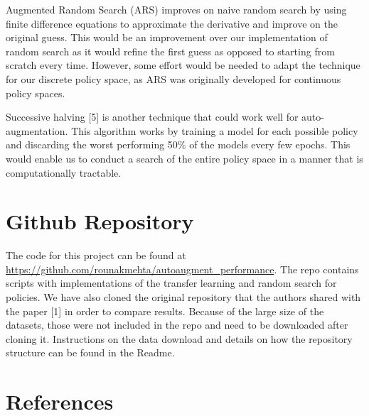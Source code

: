 \documentclass[10pt,twocolumn,letterpaper]{article}
\begin{document}
Augmented Random Search (ARS) improves on naive random search by using finite difference equations to approximate the derivative and improve on the original guess. This would be an improvement over our implementation of random search as it would refine the first guess as opposed to starting from scratch every time. However, some effort would be needed to adapt the technique for our discrete policy space, as ARS was originally developed for continuous policy spaces.

Successive halving [5] is another technique that could work well for auto-augmentation. This algorithm works by training a model for each possible policy and discarding the worst performing 50\% of the models every few epochs. This would enable us to conduct a search of the entire policy space in a manner that is computationally tractable.

\section{Github Repository}

The code for this project can be found at \url{https://github.com/rounakmehta/autoaugment_performance}. The repo contains scripts with implementations of the transfer learning and random search for policies. We have also cloned the original repository that the authors shared with the paper [1] in order to compare results. Because of the large size of the datasets, those were not included in the repo and need to be downloaded after cloning it. Instructions on the data download and details on how the repository structure can be found in the Readme.  

\section{References}
\end{document}

